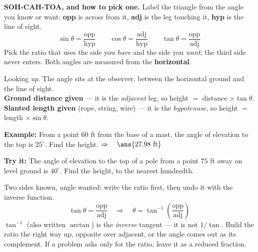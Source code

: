 \documentclass[12pt]{article}
\begin{document}

\begin{formulabox}
\textbf{SOH-CAH-TOA, and how to pick one.} Label the triangle from the angle you
know or want: \textbf{opp} is across from it, \textbf{adj} is the leg touching
it, \textbf{hyp} is the line of sight.
\[
\sin\theta=\frac{\text{opp}}{\text{hyp}}\qquad
\cos\theta=\frac{\text{adj}}{\text{hyp}}\qquad
\tan\theta=\frac{\text{opp}}{\text{adj}}
\]
Pick the ratio that uses the side you \emph{have} and the side you \emph{want};
the third side never enters. Both angles are measured from the \textbf{horizontal}.
\end{formulabox}


\begin{formulabox}
Looking \emph{up}. The angle sits at the observer, between the horizontal
ground and the line of sight.\\[2pt]
\textbf{Ground distance given} --- it is the \emph{adjacent} leg, so
height $=$ distance $\times \tan\theta$.\\[2pt]
\textbf{Slanted length given} (rope, string, wire) --- it is the
\emph{hypotenuse}, so height $=$ length $\times \sin\theta$.
\end{formulabox}

\begin{examplebox}
\textbf{Example:} From a point $60$ ft from the base of a mast, the angle of
elevation to the top is $25^\circ$. Find the height.
$\Rightarrow\quad \ans{27.98\ \text{ft}}$
\end{examplebox}

\begin{tryitbox}
\textbf{Try it:} The angle of elevation to the top of a pole from a point $75$
ft away on level ground is $40^\circ$. Find the height, to the nearest
hundredth.\\[2pt]
\end{tryitbox}


\begin{formulabox}
Two sides known, angle wanted: write the ratio first, then undo it with the
inverse function.
\[
\tan\theta=\frac{\text{opp}}{\text{adj}}\quad\Longrightarrow\quad
\theta=\tan^{-1}\!\left(\frac{\text{opp}}{\text{adj}}\right)
\]
$\tan^{-1}$ (also written $\arctan$) is the \emph{inverse} tangent --- it is not
$1/\tan$. Build the ratio the right way up, opposite over adjacent, or the angle
comes out as its complement. If a problem asks only for the ratio, leave it as a
reduced fraction.
\end{formulabox}
\end{document}
